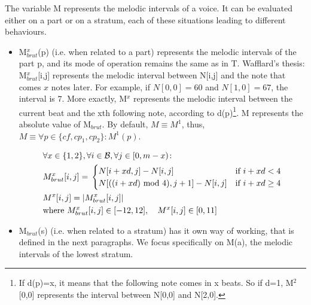 The variable M represents the melodic intervals of a voice. It can be evaluated either on a part or on a stratum, each of these situations leading to different behaviours.
\begin{itemize}
    \item 

M$^x_{brut}$(p) (i.e. when related to a part) represents the melodic intervals of the part p, and its mode of operation remains the same as in T. Wafflard's thesis: M$^x_{brut}$[i,j] represents the melodic interval between N[i,j] and the note that comes $x$ notes later. For example, if $N[0,0]=60$ and $N[1,0]=67$, the interval is $7$. More exactly, M$^x$ represents the melodic interval between the current beat and the xth following note, according to d(p)\footnote{If d(p)=x, it means that the following note comes in x beats. So if d=1, M$^2$[0,0] represents the interval between N[0,0] and N[2,0].}. M represents the absolute value of M$_{brut}$. By default, $M\equiv M^1$, thus, $M\equiv \forall p \in \{\mathit{cf}, cp_1, cp_2\} \colon M^1(p)$.

\begin{equation}
    \begin{aligned}
        &\forall x \in \{1, 2\}, \forall i \in \mathcal{B}, \forall j \in [0, m-x) \colon \\
        &M^x_{brut}[i, j] = \,  
        \begin{cases}
            N[i+xd, j] - N[i, j] & \text{if } i+xd < 4\\
            N[((i+xd) \text{ mod } 4), j+1] - N[i, j] & \text{if } i+xd \geq 4\\
        \end{cases}\\
        &M^x[i, j] = \left|M^x_{brut}[i, j]\right|\\
        &\text{where } M^x_{brut}[i, j] \in [-12, 12], \quad M^x[i, j] \in [0, 11] 
    \end{aligned}
\end{equation}


\item M$_{brut}$(s) (i.e. when related to a stratum) has it own way of working, that is defined in the next paragraphs. We focus specifically on M(a), the melodic intervals of the lowest stratum.
\end{itemize}

